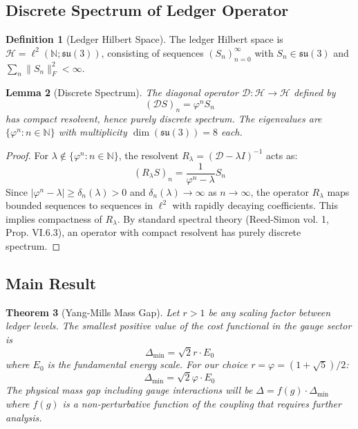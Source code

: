 \documentclass[11pt]{article}
\numberwithin{equation}{section}
\newtheorem{theorem}{Theorem}[section]
\newtheorem{lemma}[theorem]{Lemma}
\theoremstyle{definition}
\newtheorem{definition}[theorem]{Definition}
\theoremstyle{remark}
\begin{document}
\subsection{Discrete Spectrum of Ledger Operator}

\begin{definition}[Ledger Hilbert Space]
The ledger Hilbert space is $\mathcal{H} = \ell^2(\mathbb{N}; \mathfrak{su}(3))$, consisting of sequences $(S_n)_{n=0}^{\infty}$ with $S_n \in \mathfrak{su}(3)$ and $\sum_n \|S_n\|_F^2 < \infty$.
\end{definition}

\begin{lemma}[Discrete Spectrum]
\label{lem:discrete-spectrum}
The diagonal operator $\mathcal{D}: \mathcal{H} \to \mathcal{H}$ defined by
\begin{equation}
(\mathcal{D}S)_n = \varphi^n S_n
\end{equation}
has compact resolvent, hence purely discrete spectrum. The eigenvalues are $\{\varphi^n : n \in \mathbb{N}\}$ with multiplicity $\dim(\mathfrak{su}(3)) = 8$ each.
\end{lemma}

\begin{proof}
For $\lambda \notin \{\varphi^n : n \in \mathbb{N}\}$, the resolvent $R_{\lambda} = (\mathcal{D} - \lambda I)^{-1}$ acts as:
\begin{equation}
(R_{\lambda}S)_n = \frac{1}{\varphi^n - \lambda} S_n
\end{equation}
Since $|\varphi^n - \lambda| \geq \delta_n(\lambda) > 0$ and $\delta_n(\lambda) \to \infty$ as $n \to \infty$, the operator $R_{\lambda}$ maps bounded sequences to sequences in $\ell^2$ with rapidly decaying coefficients. This implies compactness of $R_{\lambda}$. By standard spectral theory (Reed-Simon vol. 1, Prop. VI.6.3), an operator with compact resolvent has purely discrete spectrum.
\end{proof}

\subsection{Main Result}

\begin{theorem}[Yang-Mills Mass Gap]
\label{thm:mass-gap}
Let $r > 1$ be any scaling factor between ledger levels. The smallest positive value of the cost functional in the gauge sector is
\begin{equation}
\Delta_{\text{min}} = \sqrt{2} r \cdot E_0
\end{equation}
where $E_0$ is the fundamental energy scale. For our choice $r = \varphi = (1+\sqrt{5})/2$:
\begin{equation}
\Delta_{\text{min}} = \sqrt{2} \varphi \cdot E_0
\end{equation}
The physical mass gap including gauge interactions will be $\Delta = f(g) \cdot \Delta_{\text{min}}$ where $f(g)$ is a non-perturbative function of the coupling that requires further analysis.
\end{theorem}
\end{document}
